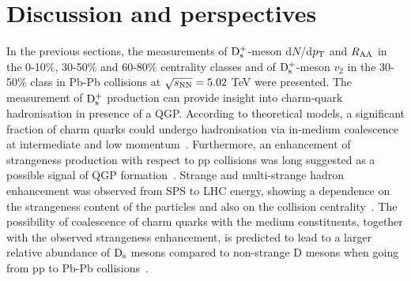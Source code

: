 \section{Discussion and perspectives}
\label{sec:discussionAA}
In the previous sections, the measurements of ${\rm D_s^+}$-meson d$N$/d$p_{\rm T}$ and $R_{\rm AA}$ in the
0-10\%, 30-50\% and 60-80\% centrality classes and of ${\rm D_s^+}$-meson $v_2$ in the 30-50\% class
in Pb-Pb collisions at $\sqrt{s_{\rm NN}} = 5.02$ TeV were presented. 
The measurement of ${\rm D_s^+}$ production can provide insight into 
charm-quark hadronisation in presence of a QGP.
According to theoretical models, a significant fraction of charm quarks could undergo hadronisation 
via in-medium coalescence at intermediate and low momentum~\cite{Greco:2003vf}. 
Furthermore, an enhancement of strangeness production with respect to 
pp collisions was long suggested as a possible signal of QGP formation~\cite{Rafelski:1982pu}. 
Strange and multi-strange hadron enhancement was observed from SPS to 
LHC energy, showing a dependence on the strangeness content of the 
particles and also on the collision centrality~\cite{ALICE:2017jyt,Appelshauser:1998va,Abelev:2007xp,Abelev:2013haa}.
 The possibility of coalescence 
of charm quarks with the medium constituents, together with the observed strangeness 
enhancement, is predicted to lead to a larger relative abundance of ${\rm D_s}$ mesons compared 
to non-strange D mesons when going from pp to Pb-Pb collisions~\cite{He:2012df}.\\



